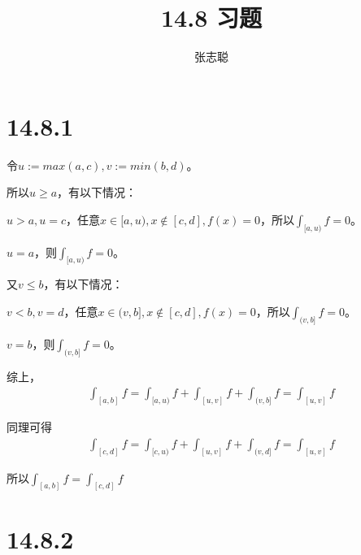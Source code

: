 \documentclass{article}
\begin{document}
\title{14.8 习题}
\author{张志聪}
\maketitle

\section*{14.8.1}

令$u := max(a, c), v := min(b, d)$。

所以$u \geq a$，有以下情况：

$u > a, u = c$，任意$x \in [a, u), x \notin [c, d], f(x) = 0$，所以$\int_{[a, u)} f = 0$。

$u = a$，则$\int_{[a, u)} f = 0$。

        又$v \leq b$，有以下情况：

      $v < b, v = d$，任意$x \in (v, b], x \notin [c, d], f(x) = 0$，所以$\int_{(v, b]} f = 0$。

$v = b$，则$\int_{(v, b]} f = 0$。

综上，
\begin{align*}
  \int_{[a, b]} f = \int_{[a, u)} f + \int_{[u, v]} f + \int_{(v, b]} f = \int_{[u, v]} f
\end{align*}

同理可得
\begin{align*}
  \int_{[c, d]} f = \int_{[c, u)} f + \int_{[u, v]} f + \int_{(v, d]} f = \int_{[u, v]} f
\end{align*}

所以$\int_{[a, b]} f = \int_{[c, d]} f$

\section*{14.8.2}
\end{document}
